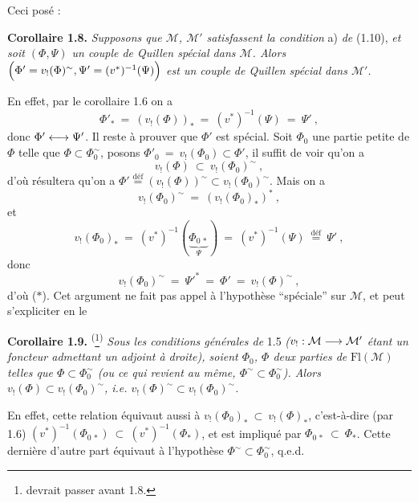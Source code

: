 Ceci posé :

\marginpar{$\Vert$}%
\textbf{Corollaire 1.8.} \textit{Supposons que $\mathcal{M}$, $\mathcal{M}'$ satisfassent la condition} a) \textit{de} (1.10), \textit{et soit $(\Phi, \Psi)$ un couple de Quillen spécial dans $\mathcal{M}$. Alors $\Bigl(\Phi' = v_{!}(\Phi)^{\sim}, \Psi' = (v^{*})^{-1}(\Psi)\Bigr)$ est un couple de Quillen spécial dans $\mathcal{M}'$.}

En effet, par le corollaire 1.6 on a
\[
\Phi'_{*} \ =\ (v_{!}(\Phi))_{*} \ =\ (v^{*})^{-1}(\Psi) \ =\ \Psi'\ ,
\]
donc $\Phi' \longleftrightarrow \Psi'$. Il reste à prouver que $\Phi'$ est spécial. Soit $\Phi_0$ une partie petite de $\Phi$ telle que $\Phi \subset \Phi_0^{\sim}$, posons $\Phi'_0 \ =\ v_{!}(\Phi_0) \subset \Phi'$,  il suffit de voir qu'on a
\[
v_{!}(\Phi) \ \subset\ v_{!}(\Phi_0)^{\sim}\ , \tag*{($*$)}
\]
d'où résultera qu'on a $\Phi' \overset{\text{déf}}{=} (v_{!}(\Phi))^{\sim} \subset v_{!}(\Phi_0)^{\sim}$. Mais on a
\[
v_{!}(\Phi_0)^{\sim} \ =\ (v_{!}(\Phi_0)_{*})^{*}\ ,
\]
et
\[
v_{!}(\Phi_0)_{*} \ =\ (v^{*})^{-1}(\underbrace{\Phi_{0\,*}}_{\Psi}) \ =\ (v^{*})^{-1}(\Psi) \ \overset{\text{déf}}{=}\ \Psi'\ ,
\]
donc
\[
v_{!}(\Phi_0)^{\sim} \ =\ \Psi'^{*} \ =\ \Phi' \ =\ v_{!}(\Phi)^{\sim}\ ,
\]
d'où ($*$). Cet argument ne fait pas appel à l'hypothèse “spéciale” sur $\mathcal{M}$, et peut s'expliciter en le

\textbf{Corollaire 1.9.} \textsuperscript{(}\footnote[4]{devrait passer avant 1.8.}\textsuperscript{)} \textit{Sous les conditions générales de} 1.5 \textit{($v_{!} : \mathcal{M} \longrightarrow \mathcal{M}'$ étant un foncteur admettant un adjoint à droite), soient $\Phi_0$, $\Phi$ deux parties de} $\mathrm{Fl}(\mathcal{M})$ \textit{telles que $\Phi \subset \Phi_0^{\sim}$ (ou ce qui revient au même, $\Phi^{\sim} \subset \Phi_0^{\sim}$). Alors $v_{!}(\Phi) \subset v_{!}(\Phi_0)^{\sim}$, i.e. $v_{!}(\Phi)^{\sim} \subset v_{!}(\Phi_0)^{\sim}$.}

En effet, cette relation équivaut aussi à $v_{!}(\Phi_0)_{*} \ \subset\ v_{!}(\Phi)_{*}$, c'est-à-dire (par 1.6) $(v^{*})^{-1}(\Phi_{0\,*}) \ \subset\ (v^{*})^{-1}(\Phi_{*})$, et est impliqué par $\Phi_{0\,*} \ \subset\ \Phi_{*}$. Cette dernière d'autre part équivaut à l'hypothèse $\Phi^{\sim} \subset \Phi_0^{\sim}$, q.e.d.

